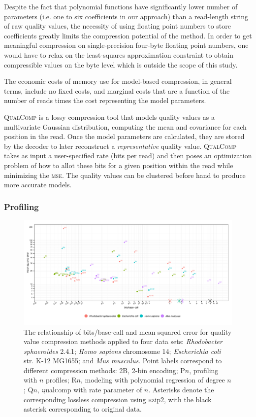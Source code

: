 \documentclass{bioinfo}
\begin{document}
\begin{methods}
Despite the fact that polynomial functions have significantly lower
number of parameters (i.e. one to six coefficients in our approach) than a read-length
string of raw quality values, the necessity of using floating point
numbers to store coefficients greatly limits the compression potential
of the method. In order to get meaningful compression on
single-precision four-byte floating point numbers, one would have to
relax on the least-squares approximation constraint to obtain
compressible values on the byte level which is outside the scope of
this study.

The economic costs of memory use for model-based compression, in
general terms, include no fixed costs, and marginal costs that are a
function of the number of reads times the cost representing the model
parameters.

\textsc{QualComp} is a lossy compression tool that models quality
values as a multivariate Gaussian distribution, computing the mean and
covariance for each position in the read\citep{Ochoa:2013rt}. Once the
model parameters are calculated, they are stored by the decoder to
later reconstruct a \emph{representative} quality value.
\textsc{QualComp} takes as input a user-specified rate (bits per read)
and then poses an optimization problem of how to allot these bits for
a given position within the read while minimizing the \textsc{mse}. The quality values
can be clustered before hand to produce more accurate models.

\subsubsection{Profiling}

\begin{figure}[!tb]%
\centerline{\includegraphics[width=7in]{compression_results.pdf}}
\caption{The relationship of bits/base-call and mean squared error for
  quality value compression methods applied to four data sets:
  \textit{Rhodobacter sphaeroides} 2.4.1; \textit{Homo sapiens}
  chromosome 14; \textit{Escherichia coli} str. K-12 MG1655; and
  \textit{Mus musculus}. Point labels correspond to different
  compression methods: 2B, 2-bin encoding; P$n$, profiling with $n$
  profiles; R$n$, modeling with polynomial regression of degree $n$;
  Q$n$, \textsc{q}ual\textsc{c}omp with rate parameter of
  $n$. Asterisks denote the corresponding lossless compression using
  \textsc{bz}ip2, with the black asterisk corresponding to original
  data.}
\label{fig:mse_vs_bpbp}
\end{figure}


\end{methods}
\end{document}
